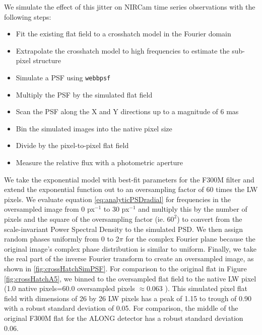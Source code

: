 \documentclass{aastex62}
\begin{document}
We simulate the effect of this jitter on NIRCam time series observations with the following steps:
\begin{itemize}
	\item Fit the existing flat field to a crosshatch model in the Fourier domain
	\item Extrapolate the crosshatch model to high frequencies to estimate the sub-pixel structure
	\item Simulate a PSF using \texttt{webbpsf} \citep{perrin2014webbpsf}
	\item Multiply the PSF by the simulated flat field
	\item Scan the PSF along the X and Y directions up to a magnitude of 6 mas
	\item Bin the simulated images into the native pixel size
	\item Divide by the pixel-to-pixel flat field
	\item Measure the relative flux with a photometric aperture
\end{itemize}



We take the exponential model with best-fit parameters for the F300M filter and extend the exponential function out to an oversampling factor of 60 times the LW pixels.
We evaluate equation \ref{eq:analyticPSDradial} for frequencies in the oversampled image from 0 px$^{-1}$ to 30 px$^{-1}$ and multiply this by the number of pixels and the square of the oversampling factor (ie. $60^2$) to convert from the scale-invariant Power Spectral Density to the simulated PSD.
We then assign random phases uniformly from 0 to 2$\pi$ for the complex Fourier plane because the original image's complex phase distribution is similar to uniform.
Finally, we take the real part of the inverse Fourier transform to create an oversampled image, as shown in \ref{fig:crossHatchSimPSF}.
For comparison to the original flat in Figure \ref{fig:crossHatchA5}, we binned to the oversampled flat field to the native LW pixel (1.0 native pixels=60.0 oversampled pixels $\approx$0.063 \arcsec).
This simulated pixel flat field with dimensions of 26 by 26 LW pixels has a peak of 1.15 to trough of 0.90 with a robust standard deviation of 0.05.
For comparison, the middle of the original F300M flat for the ALONG detector has a robust standard deviation 0.06.
\end{document}
